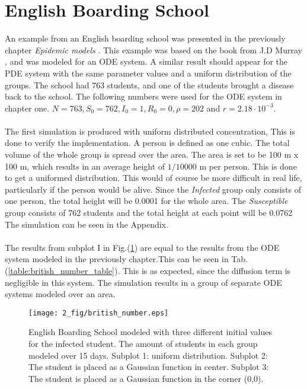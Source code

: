 \documentclass[%
twoside,                 %
final,                   %
chapterprefix=true,      %
open=right               %
10pt]{book}
\begin{document}
\section{English Boarding School}
An example from an English boarding school was presented in the previously chapter \emph{Epidemic models} . This example was based on the book from J.D Murray \cite{murray2002mathematical}, and was modeled for an ODE system. A similar result should appear for the PDE system with the same parameter values and a uniform distribution of the groups. The school had 763 students, and one of the students brought a disease back to the school. The following numbers were used for the ODE system in chapter one. $N=763, S_0=762,I_0=1,R_0=0,\rho=202$ and $r = 2.18\cdot 10^{-3}$. 
\\
\\
The first simulation is produced with uniform distributed concentration, This is done to verify the implementation. A person is defined as one cubic. The total volume of the whole group is spread over the area. The area is set to be 100 m x 100 m, which results in an average height of $1/10000$ m per person. This is done to get a uniformed distribution. This would of course be more difficult in real life, particularly if the person would be alive. Since the \emph{Infected} group only consists of one person, the total height will be 0.0001 for the whole area. The \emph{Susceptible} group consists of 762 students and the total height at each point will be 0.0762 The simulation can be seen in the Appendix. 
\\
\\
The results from subplot I in Fig.(\ref{fig:british_number}) are equal to the results from the ODE system modeled in the previously chapter.This can be seen in Tab.(\ref{table:british_number_table}). This is as expected, since the diffusion term is negligible in this system. The simulation results in a group of separate ODE systems modeled over an area.


\begin{figure}[ht]
  \centerline{\texttt{[image: 2\_fig/british\_number.eps]}}
  \caption{
  \label{fig:british_number} English Boarding School modeled with three different initial values for the infected student. The amount of students in each group modeled over 15 days. Subplot 1: uniform distribution. Subplot 2: The student is placed as a Gaussian function in center. Subplot 3: The student is placed as a Gaussian function in the corner (0,0).
  }
\end{figure}
\end{document}
